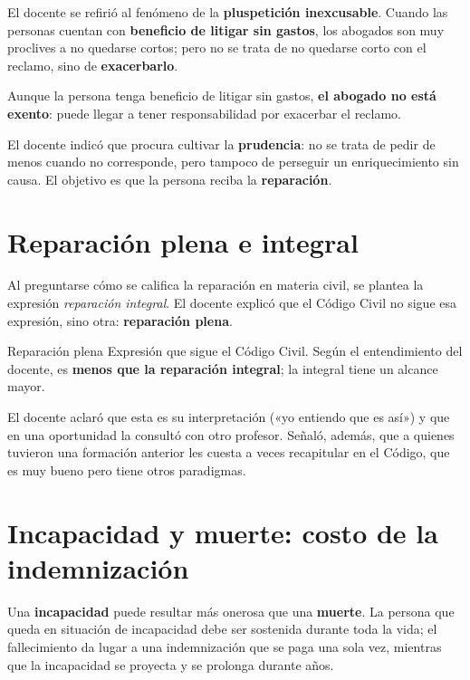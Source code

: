 \documentclass[12pt,oneside]{book}
\begin{document}
El docente se refirió al fenómeno de la \textbf{pluspetición inexcusable}. Cuando las personas cuentan con \textbf{beneficio de litigar sin gastos}, los abogados son muy proclives a no quedarse cortos; pero no se trata de no quedarse corto con el reclamo, sino de \textbf{exacerbarlo}.

\begin{important}
Aunque la persona tenga beneficio de litigar sin gastos, \textbf{el abogado no está exento}: puede llegar a tener responsabilidad por exacerbar el reclamo.
\end{important}

El docente indicó que procura cultivar la \textbf{prudencia}: no se trata de pedir de menos cuando no corresponde, pero tampoco de perseguir un enriquecimiento sin causa. El objetivo es que la persona reciba la \textbf{reparación}.

\section{Reparación plena e integral}

Al preguntarse cómo se califica la reparación en materia civil, se plantea la expresión \emph{reparación integral}. El docente explicó que el Código Civil no sigue esa expresión, sino otra: \textbf{reparación plena}.

\begin{definition}{Reparación plena}
Expresión que sigue el Código Civil. Según el entendimiento del docente, es \textbf{menos que la reparación integral}; la integral tiene un alcance mayor.
\end{definition}

El docente aclaró que esta es su interpretación («yo entiendo que es así») y que en una oportunidad la consultó con otro profesor. Señaló, además, que a quienes tuvieron una formación anterior les cuesta a veces recapitular en el Código, que es muy bueno pero tiene otros paradigmas.

\section{Incapacidad y muerte: costo de la indemnización}

\begin{important}
Una \textbf{incapacidad} puede resultar más onerosa que una \textbf{muerte}. La persona que queda en situación de incapacidad debe ser sostenida durante toda la vida; el fallecimiento da lugar a una indemnización que se paga una sola vez, mientras que la incapacidad se proyecta y se prolonga durante años.
\end{important}
\end{document}
